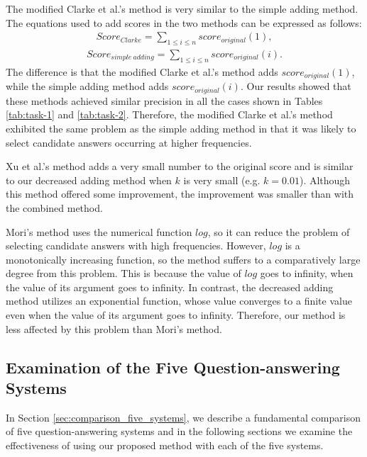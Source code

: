 The modified Clarke et al.'s method is very similar 
to the simple adding method. 
The equations used to add scores in the two methods can be 
expressed as follows:
  \begin{eqnarray}
    \label{eqn:Clarke1_}
    Score_{Clarke} = \displaystyle \sum_{1 \leq i \leq n} score_{original}(1),
  \end{eqnarray}
  \begin{eqnarray}
    \label{eqn:simple_adding}
    Score_{simple \ adding} = \displaystyle \sum_{1 \leq i \leq n} score_{original}(i).
  \end{eqnarray}
The difference is that 
the modified Clarke et al.'s method adds $score_{original}(1)$,
while the simple adding method adds $score_{original}(i)$. 
Our results showed that these methods achieved similar precision
in all the cases shown in Tables \ref{tab:task-1} and \ref{tab:task-2}. 
Therefore, 
the modified Clarke et al.'s method exhibited
the same problem as the simple adding method
in that it was likely to select candidate answers occurring at
higher frequencies. 

Xu et al.'s method adds a very small number to the original score and 
is similar to our decreased adding method when $k$ is very small (e.g. $k=0.01$). 
Although this method offered some improvement, 
the improvement was smaller than with the combined method. 

Mori's method uses the numerical function $log$, 
so it can reduce the problem of selecting candidate answers with high frequencies. 
However, $log$ is a monotonically increasing function, so 
the method suffers to a comparatively large degree from this problem. 
This is because the value of $log$ goes to infinity, 
when the value of its argument goes to infinity. 
In contrast, the decreased adding method utilizes an exponential function, 
whose value converges to a finite value even when 
the value of its argument goes to infinity. 
Therefore, our method is less affected by this problem than Mori's method. 

\subsection{Examination of the Five Question-answering Systems}

In Section \ref{sec:comparison_five_systems}, 
we describe a fundamental comparison of five question-answering systems 
and in the following sections 
we examine the effectiveness of using our proposed method
with each of the five systems. 

